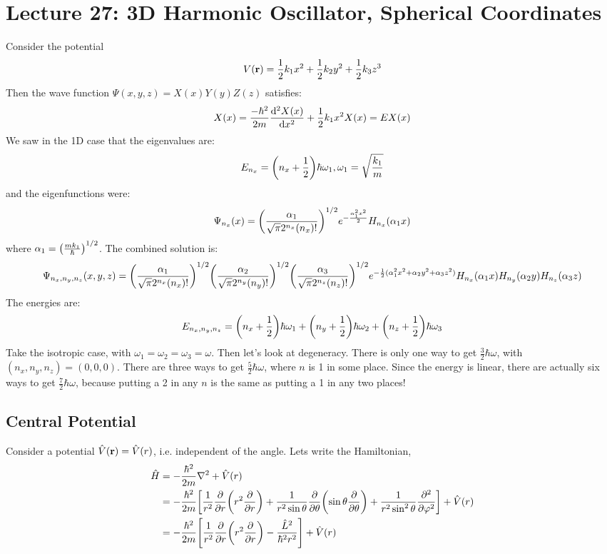 \section{Lecture 27: 3D Harmonic Oscillator, Spherical Coordinates}

Consider the potential
\[ V(\mathbf{r}) = \frac{1}{2} k_1 x^2 + \frac{1}{2} k_2 y^2 + \frac{1}{2} k_3 z^3 \]
Then the wave function $\Psi(x, y, z) = X(x) Y(y) Z(z)$ satisfies:
\[ X(x) = \frac{-\hbar^2}{2m} \dv{^2 X(x)}{x^2} + \frac{1}{2} k_1 x^2 X(x) = EX(x) \]
We saw in the 1D case that the eigenvalues are:
\[ E_{n_x} = \qty(n_x + \frac{1}{2}) \hbar \omega_1, \omega_1 = \sqrt{\frac{k_1}{m}} \]
and the eigenfunctions were:
\[ \Psi_{n_x}(x) = \qty(\frac{\alpha_1}{\sqrt{\pi} 2^{n_x} (n_x)!})^{1/2} e^{-\frac{\alpha_1^2 x^2}{2}} H_{n_x}(\alpha_1 x)\]
where $\alpha_1 = \qty(\frac{mk_1}{\hbar})^{1/2}$. The combined solution is:
\[ \Psi_{n_x, n_y, n_z}(x, y, z) =  \qty(\frac{\alpha_1}{\sqrt{\pi} 2^{n_x} (n_x)!})^{1/2} \qty(\frac{\alpha_2}{\sqrt{\pi} 2^{n_y} (n_y)!})^{1/2} \qty(\frac{\alpha_3}{\sqrt{\pi} 2^{n_z} (n_z)!})^{1/2} e^{-\frac{1}{2}(\alpha_1^2 x^2 + \alpha_2 y^2 + \alpha_3 z^2)} H_{n_x}(\alpha_1 x) H_{n_y}(\alpha_2 y) H_{n_z}(\alpha_3 z) \]
The energies are:
\[ E_{n_x, n_y, n_z} = \qty(n_x + \frac{1}{2}) \hbar \omega_1 + \qty(n_y + \frac{1}{2}) \hbar \omega_2 + \qty(n_z + \frac{1}{2}) \hbar \omega_3  \]
Take the isotropic case, with $\omega_1 = \omega_2 = \omega_3 = \omega$. Then let's look at degeneracy. There is only one way to get $\frac{3}{2} \hbar \omega$,
with $(n_x, n_y, n_z) = (0, 0, 0)$. There are three ways to get $\frac{5}{2} \hbar \omega$, where $n$ is 1 in some place. Since the energy is linear,
there are actually six ways to get $\frac{7}{2} \hbar \omega$, because putting a 2 in any $n$ is the same as putting a 1 in any two places!

\subsection{Central Potential}
Consider a potential $\hat{V}(\mathbf{r}) = \hat{V}(r)$, i.e. independent of the angle. Lets write the Hamiltonian,
\begin{align*}
    \hat{H} &= - \frac{\hbar^2}{2m} \nabla^2 + \hat{V}(r) \\
    &= -\frac{\hbar^2}{2m} \qty[\frac{1}{r^2} \pdv{}{r}\qty(r^2 \pdv{}{r}) + \frac{1}{r^2 \sin\theta} \pdv{}{\theta}\qty(\sin \theta \pdv{}{\theta}) + \frac{1}{r^2 \sin^2 \theta} \pdv{^2}{\varphi^2}] + \hat{V}(r) \\
    &= -\frac{\hbar^2}{2m} \qty[\frac{1}{r^2} \pdv{}{r}\qty(r^2 \pdv{}{r}) - \frac{\hat{L}^2}{\hbar^2 r^2}] + \hat{V}(r)
\end{align*}

